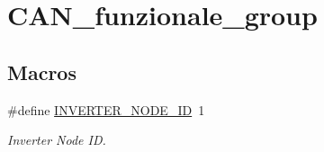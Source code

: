 \hypertarget{group___c_a_n__funzionale__group}{}\section{C\+A\+N\+\_\+funzionale\+\_\+group}
\label{group___c_a_n__funzionale__group}
\subsection*{Macros}
\begin{DoxyCompactItemize}
\item 
\mbox{\label{group___c_a_n__funzionale__group_ga59ea82aec4abe07072cbdad555a8c1b9}} 
\#define \mbox{\hyperlink{group___c_a_n__funzionale__group_ga59ea82aec4abe07072cbdad555a8c1b9}{I\+N\+V\+E\+R\+T\+E\+R\+\_\+\+N\+O\+D\+E\+\_\+\+ID}}~1
\begin{DoxyCompactList}\small\item\em Inverter Node ID. \end{DoxyCompactList}\end{DoxyCompactItemize}
